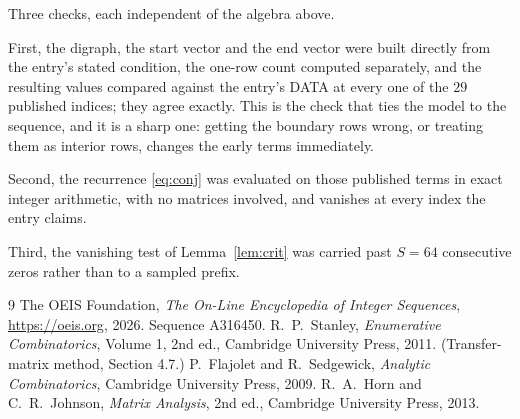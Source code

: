 \documentclass[11pt,a4paper]{article}
\theoremstyle{plain}
\theoremstyle{definition}
\begin{document}
Three checks, each independent of the algebra above.

First, the digraph, the start vector and the end vector were built directly from the
entry's stated condition, the one-row count computed separately, and the resulting values
compared against the entry's DATA at every one of the $29$ published indices; they
agree exactly. This is the check that ties the model to the sequence, and it is a sharp one:
getting the boundary rows wrong, or treating them as interior rows, changes the early terms
immediately.

Second, the recurrence \eqref{eq:conj} was evaluated on those published terms in exact
integer arithmetic, with no matrices involved, and vanishes at every index the entry claims.

Third, the vanishing test of Lemma~\ref{lem:crit} was carried past $S=64$ consecutive
zeros rather than to a sampled prefix.

\begin{thebibliography}{9}
 The OEIS Foundation, \emph{The On-Line Encyclopedia of Integer
Sequences}, \url{https://oeis.org}, 2026. Sequence A316450.
 R.~P.~Stanley, \emph{Enumerative Combinatorics}, Volume 1, 2nd ed.,
Cambridge University Press, 2011. (Transfer-matrix method, Section 4.7.)
 P.~Flajolet and R.~Sedgewick, \emph{Analytic Combinatorics}, Cambridge
University Press, 2009.
 R.~A.~Horn and C.~R.~Johnson, \emph{Matrix Analysis}, 2nd ed., Cambridge
University Press, 2013.
\end{thebibliography}
\end{document}
